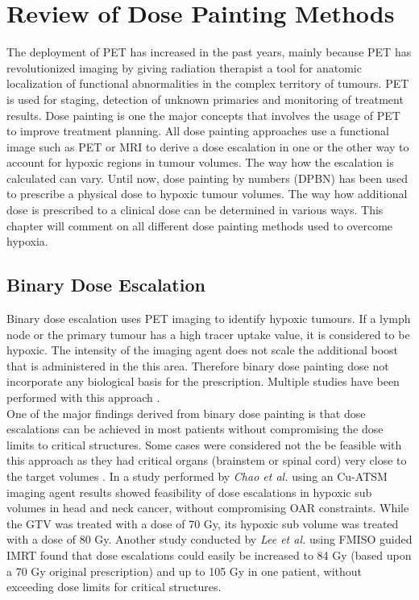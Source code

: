 \section{Review of Dose Painting Methods}
The deployment of PET has increased in the past years, mainly because PET has revolutionized imaging by giving radiation therapist a tool for anatomic localization of functional abnormalities in the complex territory of tumours. PET is used for staging, detection of unknown primaries and monitoring of treatment results. Dose painting is one the major concepts that involves the usage of PET to improve treatment planning. All dose painting approaches use a functional image such as PET or MRI to derive a dose escalation in one or the other way to account for hypoxic regions in tumour volumes. The way how the escalation is calculated can vary. Until now, dose painting by numbers (DPBN) has been used to prescribe a physical dose to hypoxic tumour volumes. The way how additional dose is prescribed to a clinical dose can be determined in various ways. This chapter will comment on all different dose painting methods used to overcome hypoxia.
\subsection{Binary Dose Escalation}
Binary dose escalation uses PET imaging to identify hypoxic tumours. If a lymph node or the primary tumour has a high tracer uptake value, it is considered to be hypoxic. The intensity of the imaging agent does not scale the additional boost that is administered in the this area. Therefore binary dose painting dose not incorporate any biological basis for the prescription. Multiple studies have been performed with this approach \cite{pmid20855118, pmid11240261, pmid17869020, pmid19203843}.\\One of the major findings derived from binary dose painting is that dose escalations can be achieved in most patients without compromising the dose limits to critical structures. Some cases were considered not the be feasible with this approach as they had critical organs (brainstem or spinal cord) very close to the target volumes \cite{pmid20855118}. In a study performed by \textit{Chao et al.} \cite{pmid11240261} using an Cu-ATSM imaging agent results showed feasibility of dose escalations in hypoxic sub volumes in head and neck cancer, without compromising OAR constraints. While the GTV was treated with a dose of 70 Gy, its hypoxic sub volume was treated with a dose of 80 Gy. Another study conducted by \textit{Lee et al.} \cite{pmid17869020} using FMISO guided IMRT found that dose escalations could easily be increased to 84 Gy (based upon a 70 Gy original prescription) and up to 105 Gy in one patient, without exceeding dose limits for critical structures. 
